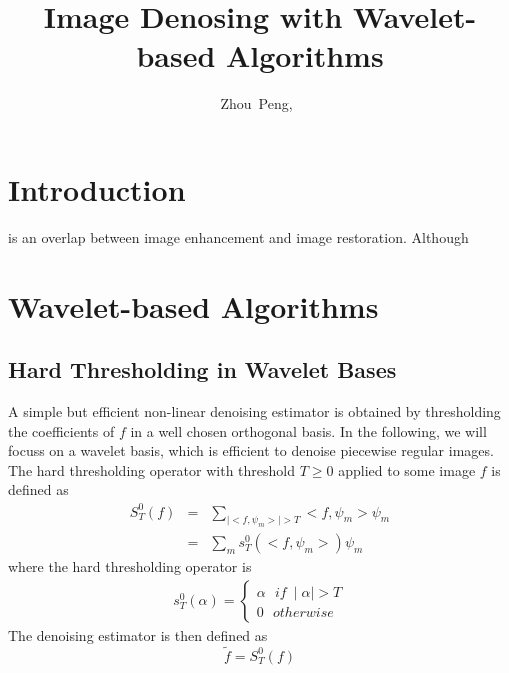 \documentclass[journal,comsoc]{IEEEtran}
\begin{document}
\title{Image Denosing with Wavelet-based Algorithms}
\author{Zhou~Peng,~}
\maketitle

\begin{abstract}
  
\end{abstract}

\begin{IEEEkeywords}

\end{IEEEkeywords}

\section{Introduction}
 is an overlap between image enhancement and image restoration. Although


\section{Wavelet-based Algorithms}
\label{sec:wavelet-based-algorithms}

\subsection{Hard Thresholding in Wavelet Bases}
\label{subsec:hard-thresholding-in-wavelet-bases}

A simple but efficient non-linear denoising estimator is obtained by thresholding the coefficients of $f$
in a well chosen orthogonal basis.
In the following, we will focuss on a wavelet basis, which is efficient to denoise piecewise regular images.
The hard thresholding operator with threshold $T\ge{0}$ applied to some image $f$ is defined as
\begin{eqnarray}
  S_T^0(f)&=&\sum_{\mid{<f,\psi_m>\mid}>T}<f,\psi_m>\psi_m\\
  &=&\sum_{m}s_T^0{(<f,\psi_m>)\psi_m}\nonumber
\end{eqnarray}
where the hard thresholding operator is
\begin{eqnarray}
  s_T^{0}(\alpha)=
  \begin{cases}
    \alpha\ \ \ if\ \mid{\alpha}\mid>T\\
    0\ \ \ otherwise
  \end{cases}
\end{eqnarray}
The denoising estimator is then defined as
\begin{equation}
  \tilde{f}=S_T^0(f)
\end{equation}
\end{document}

